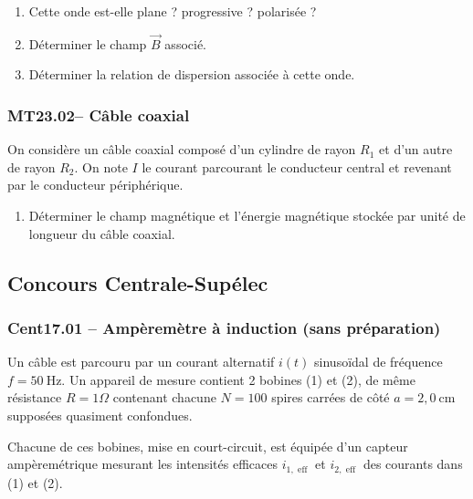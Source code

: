\begin{enumerate}
    \item Cette onde est-elle plane ? progressive ? polarisée ?
    \item Déterminer le champ $\overrightarrow{B}$ associé.
    \item Déterminer la relation de dispersion associée à cette onde.
\end{enumerate}

\subsubsection*{MT23.02-- Câble coaxial }

On considère un câble coaxial composé d'un cylindre de rayon $R_1$ et d'un autre de rayon $R_2$. On note $I$ le courant parcourant le conducteur central et revenant par le conducteur périphérique.

\begin{enumerate}
    \item Déterminer le champ magnétique et l'énergie magnétique stockée par unité de longueur du câble coaxial.
\end{enumerate}

\newpage
\subsection*{Concours Centrale-Supélec}




\subsubsection*{Cent17.01 -- Ampèremètre à induction (sans préparation)  \lesdeux}

Un câble est parcouru par un courant alternatif $i(t)$ sinusoïdal de fréquence $f=50 \mathrm{~Hz}$. Un appareil de mesure contient 2 bobines (1) et (2), de même résistance $R=1 \Omega$ contenant chacune $N=100$ spires carrées de côté $a=2,0 \mathrm{~cm}$ supposées quasiment confondues.

Chacune de ces bobines, mise en court-circuit, est équipée d'un capteur ampèremétrique mesurant les intensités efficaces $i_{1, \text { eff }}$ et $i_{2, \text { eff }}$ des courants dans (1) et (2).

